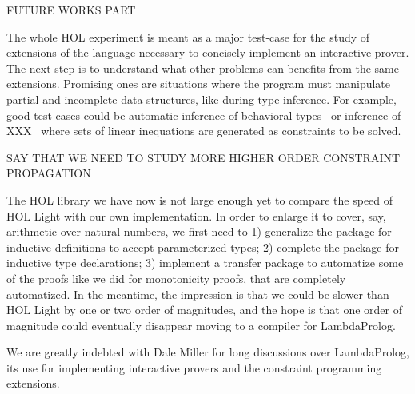 \documentclass[preprint]{sigplanconf}
\begin{document}
FUTURE WORKS PART

The whole HOL experiment is meant as a major test-case for the study of extensions of the language necessary to concisely implement an interactive prover. The next step is to understand what other problems can benefits from the same extensions. Promising ones are situations where the program must manipulate partial and incomplete data structures, like during type-inference. For example, good test cases could be automatic inference of behavioral types~\cite{cosimo1} or inference of XXX~\cite{baillot1} where sets of linear inequations are generated as constraints to be solved.

SAY THAT WE NEED TO STUDY MORE HIGHER ORDER CONSTRAINT PROPAGATION

The HOL library we have now is not large enough yet to compare the speed of HOL Light with our own implementation. In order to enlarge it to cover, say, arithmetic over natural numbers, we first need to 1) generalize the package for inductive definitions to accept parameterized types; 2) complete the package for inductive type declarations; 3) implement a transfer package to automatize some of the proofs like we did for monotonicity proofs, that are completely automatized. In the meantime, the impression is that we could be slower than HOL Light by one or two order of magnitudes, and the hope is that one order of magnitude could eventually disappear moving to a compiler for LambdaProlog.




\acks

We are greatly indebted with Dale Miller for long discussions over LambdaProlog, its use for implementing interactive provers and the constraint programming extensions.



\end{document}
